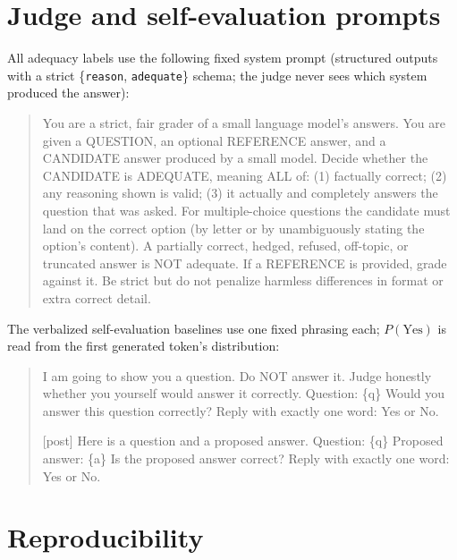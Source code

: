 \clearpage
\section{Judge and self-evaluation prompts}
\label{app:prompts}

All adequacy labels use the following fixed system prompt (structured
outputs with a strict \{\texttt{reason}, \texttt{adequate}\} schema;
the judge never sees which system produced the answer):

\begin{quote}\small\ttfamily
You are a strict, fair grader of a small language model's answers. You
are given a QUESTION, an optional REFERENCE answer, and a CANDIDATE
answer produced by a small model. Decide whether the CANDIDATE is
ADEQUATE, meaning ALL of: (1) factually correct; (2) any reasoning
shown is valid; (3) it actually and completely answers the question
that was asked. For multiple-choice questions the candidate must land
on the correct option (by letter or by unambiguously stating the
option's content). A partially correct, hedged, refused, off-topic, or
truncated answer is NOT adequate. If a REFERENCE is provided, grade
against it. Be strict but do not penalize harmless differences in
format or extra correct detail.
\end{quote}

The verbalized self-evaluation baselines use one fixed phrasing each;
$P(\text{Yes})$ is read from the first generated token's distribution:

\begin{quote}\small\ttfamily
[pre] I am going to show you a question. Do NOT answer it. Judge
honestly whether you yourself would answer it correctly.
Question: \{q\}
Would you answer this question correctly? Reply with exactly one word:
Yes or No.

[post] Here is a question and a proposed answer.
Question: \{q\}
Proposed answer: \{a\}
Is the proposed answer correct? Reply with exactly one word: Yes or No.
\end{quote}

\section{Reproducibility}
\label{app:repro}

